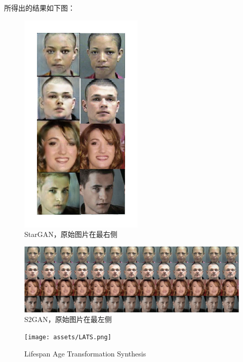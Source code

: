 \documentclass[12pt,a4paper]{article}
\begin{document}
所得出的结果如下图：
\begin{figure}[H]
	\centering
	\includegraphics[scale=0.35]{assets/StarGAN.png}
	\caption{StarGAN，原始图片在最右侧}
\end{figure}


\begin{figure}[H]
	\centering
	\includegraphics[scale=0.35]{assets/S2GAN.png}
	\caption{S2GAN，原始图片在最左侧}
\end{figure}

\begin{figure}[H]
	\centering
	\texttt{[image: assets/LATS.png]}
	\caption{Lifespan Age Transformation Synthesis}
\end{figure}







\end{document}
